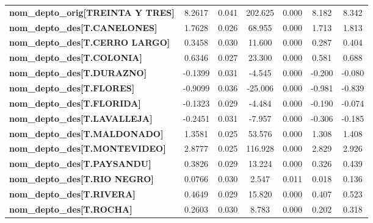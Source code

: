 \begin{center}
\begin{tabular}{lcccccc}
\textbf{nom\_depto\_orig[TREINTA Y TRES]}  &       8.2617  &        0.041     &   202.625  &         0.000        &        8.182    &        8.342     \\
\textbf{nom\_depto\_des[T.CANELONES]}      &       1.7628  &        0.026     &    68.955  &         0.000        &        1.713    &        1.813     \\
\textbf{nom\_depto\_des[T.CERRO LARGO]}    &       0.3458  &        0.030     &    11.600  &         0.000        &        0.287    &        0.404     \\
\textbf{nom\_depto\_des[T.COLONIA]}        &       0.6346  &        0.027     &    23.300  &         0.000        &        0.581    &        0.688     \\
\textbf{nom\_depto\_des[T.DURAZNO]}        &      -0.1399  &        0.031     &    -4.545  &         0.000        &       -0.200    &       -0.080     \\
\textbf{nom\_depto\_des[T.FLORES]}         &      -0.9099  &        0.036     &   -25.006  &         0.000        &       -0.981    &       -0.839     \\
\textbf{nom\_depto\_des[T.FLORIDA]}        &      -0.1323  &        0.029     &    -4.484  &         0.000        &       -0.190    &       -0.074     \\
\textbf{nom\_depto\_des[T.LAVALLEJA]}      &      -0.2451  &        0.031     &    -7.957  &         0.000        &       -0.306    &       -0.185     \\
\textbf{nom\_depto\_des[T.MALDONADO]}      &       1.3581  &        0.025     &    53.576  &         0.000        &        1.308    &        1.408     \\
\textbf{nom\_depto\_des[T.MONTEVIDEO]}     &       2.8777  &        0.025     &   116.928  &         0.000        &        2.829    &        2.926     \\
\textbf{nom\_depto\_des[T.PAYSANDU]}       &       0.3826  &        0.029     &    13.224  &         0.000        &        0.326    &        0.439     \\
\textbf{nom\_depto\_des[T.RIO NEGRO]}      &       0.0766  &        0.030     &     2.547  &         0.011        &        0.018    &        0.136     \\
\textbf{nom\_depto\_des[T.RIVERA]}         &       0.4649  &        0.029     &    15.820  &         0.000        &        0.407    &        0.523     \\
\textbf{nom\_depto\_des[T.ROCHA]}          &       0.2603  &        0.030     &     8.783  &         0.000        &        0.202    &        0.318     \\

\end{tabular}
\end{center}
